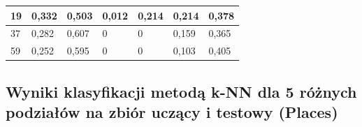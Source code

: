 \documentclass{classrep}
\begin{document}
{\begin{table}[H]
\begin{center}
\begin{tabular}{|l|l|l|l|l|l|l|}
19                                                       & 0,332                                                & 0,503                                                   & 0,012                                                    & 0,214                                                       & 0,214                                                   & 0,378                                                      \\ \hline
37                                                       & 0,282                                                & 0,607                                                   & 0                                                        & 0                                                           & 0,159                                                   & 0,365                                                      \\ \hline
59                                                       & 0,252                                                & 0,595                                                   & 0                                                        & 0                                                           & 0,103                                                   & 0,405                                                      \\ \hline
\end{tabular}
\end{center}
\end{table}

\subsection{Wyniki klasyfikacji metodą k-NN dla 5 różnych podziałów na zbiór uczący i testowy (Places)}

}
\end{document}
